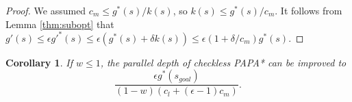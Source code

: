 \documentclass[letterpaper]{article}
\newtheorem{cor}{Corollary}
\begin{document}
\begin{proof}
We assumed $c_m \le g^*(s) / k(s)$, so $k(s) \le g^*(s) / c_m$.
It follows from Lemma \ref{thm:subopt} that $g'(s) \le \epsilon g'^*(s) \le \epsilon(g^*(s) + \delta k(s)) \le \epsilon(1+\delta/c_m)g^*(s)$.
\end{proof}

\begin{cor}
\label{cor:delta}
If $w \le 1$, the parallel depth of checkless PAPA* can be improved to
\[\frac{\epsilon g^*(s_{goal})}{(1-w)(c_l+(\epsilon-1)c_m)}.\]
\end{cor}



\end{document}
